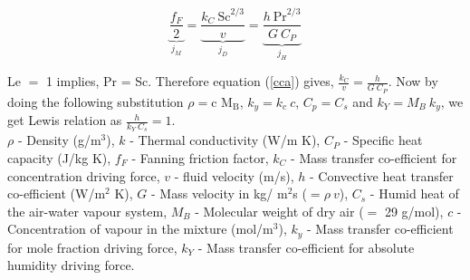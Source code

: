 \documentclass[a4paper, 12 pt]{article}
\begin{document}
\begin{enumerate}
    \begin{equation}\label{cca}
        \underbrace{\frac{f_F}{2}}_{j_M}=\underbrace{\frac{k_C\ \text{Sc}^{2/3}}{v}}_{j_D}=\underbrace{\frac{h\ \text{Pr}^{2/3}}{G\ C_P}}_{j_H}
    \end{equation}
    
    Le $=$ 1 implies, Pr = Sc. Therefore equation (\ref{cca}) gives, $\frac{k_C}{v}=\frac{h}{G\ C_P}$. Now by doing the following substitution $\rho = \text{c M}_\text{B}$, $k_y=k_c\ c$, $C_p=C_s$ and $k_Y=M_B\ k_y$, we get Lewis relation as $\boxed{\frac{h}{k_Y\ C_s}=1}$.\\[2 mm]$\rho$ - Density (g/m$^3$), $k$ - Thermal conductivity (W/m K), $C_P$ - Specific heat capacity (J/kg K), $f_F$ - Fanning friction factor, $k_C$ - Mass transfer co-efficient for concentration driving force, $v$ - fluid velocity (m/s), $h$ - Convective heat transfer co-efficient (W/m$^2$ K), $G$ - Mass velocity in kg/ m$^2$s ($=\rho \ v$), $C_s$ - Humid heat of the air-water vapour system, $M_B$ - Molecular weight of dry air ($=$ 29 g/mol), $c$ - Concentration of vapour in the mixture (mol/m$^3$), $k_y$ - Mass transfer co-efficient for mole fraction driving force, $k_Y$ - Mass transfer co-efficient for absolute humidity driving force.
    

\end{enumerate}
\end{document}
